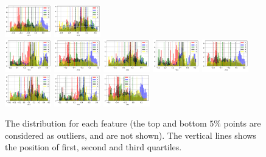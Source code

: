 \documentclass[11pt]{article}
\begin{document}
\begin{figure}[H]
  \includegraphics[width=0.18\textwidth]{../code/Task2/Analysis/Hist-Z21}
  \includegraphics[width=0.18\textwidth]{../code/Task2/Analysis/Hist-X31} \\
  \includegraphics[width=0.18\textwidth]{../code/Task2/Analysis/Hist-Y31}
  \includegraphics[width=0.18\textwidth]{../code/Task2/Analysis/Hist-Z31}
  \includegraphics[width=0.18\textwidth]{../code/Task2/Analysis/Hist-X41}
  \includegraphics[width=0.18\textwidth]{../code/Task2/Analysis/Hist-Y41}
  \includegraphics[width=0.18\textwidth]{../code/Task2/Analysis/Hist-Z41} \\
  \includegraphics[width=0.18\textwidth]{../code/Task2/Analysis/Hist-X51}
  \includegraphics[width=0.18\textwidth]{../code/Task2/Analysis/Hist-Y51}
  \includegraphics[width=0.18\textwidth]{../code/Task2/Analysis/Hist-Z51}
  \caption{The distribution for each feature (the top and bottom $5\%$ points are considered as outliers, and are not shown). The vertical lines shows the position of first, second and third quartiles.}
  \label{task-2-data-distribution-feature}
\end{figure}
\end{document}
